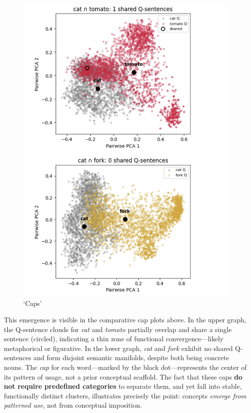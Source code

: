 \documentclass[12pt]{article}
\providecommand{\pandocbounded}[1]{#1}   %
\begin{document}
\begin{figure}
\centering
\pandocbounded{\includegraphics[keepaspectratio]{figures/caps.png}}
\caption{`Caps'}
\end{figure}

This emergence is visible in the comparative cap plots above. In the upper graph, the Q-sentence clouds for \emph{cat} and \emph{tomato} partially overlap and share a single sentence (circled), indicating a thin zone of functional convergence---likely metaphorical or figurative. In the lower graph, \emph{cat} and \emph{fork} exhibit no shared Q-sentences and form disjoint semantic manifolds, despite both being concrete nouns. The \emph{cap} for each word---marked by the black dot---represents the center of its pattern of usage, not a prior conceptual scaffold. The fact that these caps \textbf{do not require predefined categories} to separate them, and yet fall into stable, functionally distinct clusters, illustrates precisely the point: concepts \emph{emerge from patterned use}, not from conceptual imposition.
\end{document}
